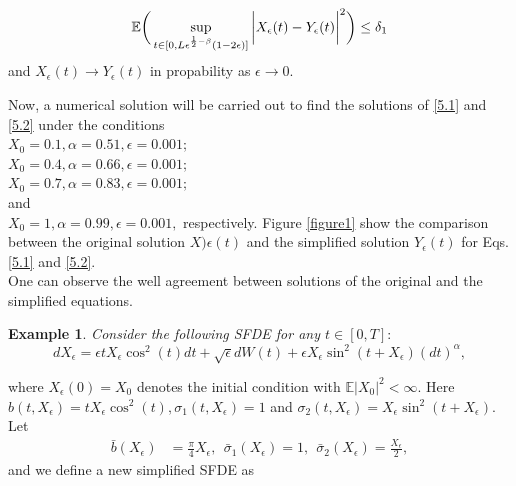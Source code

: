 \documentclass[a4 paper, 12pt]{report}
\theoremstyle{plain}
\newtheorem{example}[theorem]{\textbf{Example}}
\begin{document}
$$
\mathbb{E}\bigg(\sup_{t\in[0,L\epsilon^{\frac{1}{2} - \beta}(1-2\epsilon)]}\bigg|X_\epsilon(t) - Y_\epsilon(t)\bigg|^2\bigg)\leq \delta_1\\%
$$
and $X_\epsilon(t)\rightarrow Y_\epsilon(t)$ in propability as $\epsilon\rightarrow 0.$\\
\par Now, a numerical solution will be carried out to find the solutions of \eqref{5.1}
and \eqref{5.2} under the conditions \\
$X_0 = 0.1, \alpha = 0.51, \epsilon = 0.001;$\\
$ X_0 = 0.4, \alpha = 0.66, \epsilon = 0.001;$\\
$X_0 = 0.7, \alpha = 0.83, \epsilon = 0.001;$\\
 and\\
$ X_0 = 1, \alpha = 0.99, \epsilon = 0.001,$
 respectively. Figure \ref{figure1} show the comparison between the original solution
$X)\epsilon(t)$ and the simplified solution $Y_\epsilon(t)$ for Eqs. \eqref{5.1} and \eqref{5.2}.\\ One can observe the well agreement between solutions of the original and the simplified equations.
\begin{example}\label{e5.2}
\normalfont
Consider the following SFDE for any $t\in[0,T]:$
\begin{equation}\label{5.3}
dX_\epsilon  = \epsilon t X_\epsilon\cos^2(t)dt+\sqrt{\epsilon}dW(t)+\epsilon X_\epsilon\sin^2(t+X_\epsilon)(dt)^{\alpha},
\end{equation}
\end{example}
where $X_\epsilon (0) = X_0$ denotes the initial condition with $\mathbb{E}|X_0|^2<\infty.$ Here $b(t,X_\epsilon) = tX_\epsilon\cos^2(t),\sigma_1(t,X_\epsilon) = 1$ and $\sigma_2(t,X_\epsilon) = X_\epsilon\sin^2(t+X_\epsilon).$ Let  
\begin{align*}
 \bar{b}(X_\epsilon)& = \frac{\pi}{4} X_\epsilon,~~\bar{\sigma}_1(X_\epsilon) = 1,~~\bar{\sigma}_2(X_\epsilon) = \frac{X_\epsilon}{2},
\end{align*}
and we define a new simplified SFDE as
\end{document}
